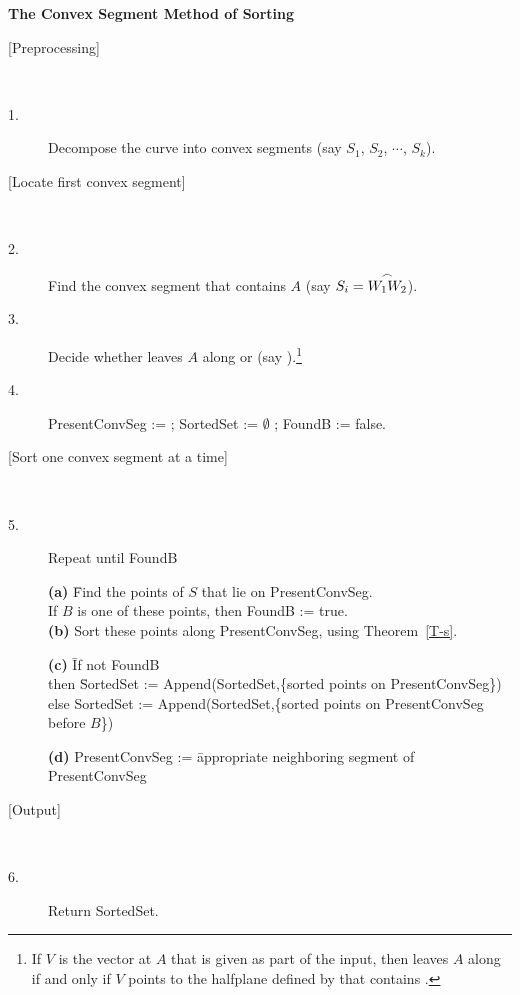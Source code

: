 \begin{center}{\bf The Convex Segment Method of Sorting}\end{center}
\begin{description}
\item[{[Preprocessing]}] \ \ \ 
\item[\hspace{.1in} 1.] Decompose the curve into convex segments
	(say $S_{1}$, $S_{2}$, $\cdots$, $S_{k}$).
%
\item[{[Locate first convex segment]}] \ \ \ 
\item[\hspace{.1in} 2.]
	Find the convex segment that contains $A$ (say $S_{i} = \mbox{$\stackrel{\frown}{\mbox{$W_{1}$}\mbox{$W_{2}$}}$}$).
\item[\hspace{.1in} 3.]
	Decide whether  leaves $A$ along  or \arc{AW_{2}}
	(say \arc{AW_{1}}).\footnote{If $V$ is the vector at $A$ that is given as 
		part of the input, then \arc{AB} leaves $A$ along \arc{AW_{1}} if 
\label{alg-page}
		and only if $V$ points to the halfplane defined by  
		that contains .}
\item[\hspace{.1in} 4.]
	PresentConvSeg :=  ;
	SortedSet := $\emptyset$ ;
	FoundB := false.
%
\item[{[Sort one convex segment at a time]}] \ \ \ 
\item[\hspace{.1in} 5.]
	Repeat until FoundB
\item[]
\begin{tabbing}
\hspace{-.3in} {\bf (a)} \= Find the points of $S$ that lie on PresentConvSeg.\\
	\> If $B$ is one of these points, then FoundB := true.\\
\hspace{-.3in} {\bf (b)} \> Sort these points along PresentConvSeg, 
	using Theorem~\ref{T-s}.
\end{tabbing}
\pagebreak
\begin{tabbing}
\hspace{-.3in} {\bf (c)} \= If not FoundB\\
	\> then \= SortedSet := Append(SortedSet,\{sorted points on PresentConvSeg\})\\
	\> else \> SortedSet := Append(SortedSet,\{sorted points on 
PresentConvSeg before $B$\})
\end{tabbing}
\begin{tabbing}
\hspace{-.3in} {\bf (d)} PresentConvSeg := \= appropriate neighboring segment of PresentConvSeg
\end{tabbing}


\item[{[Output]}] \ \ \ 
\item[\hspace{.1in} 6.]
	Return SortedSet.
\end{description}

